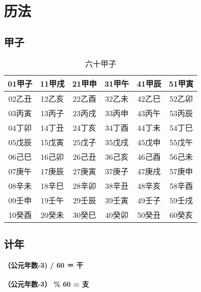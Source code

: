 \section{历法}
\subsection{甲子}
\begin{table}[H]
  \centering
  \caption[]{六十甲子\footnotemark}
  \begin{tabular}{|c|c|c|c|c|c|}
    \hline 01甲子 & 11甲戌 & 21甲申 & 31甲午 & 41甲辰 & 51甲寅 \\
    \hline 02乙丑 & 12乙亥 & 22乙酉 & 32乙未 & 42乙巳 & 52乙卯 \\
    \hline 03丙寅 & 13丙子 & 23丙戌 & 33丙申 & 43丙午 & 53丙辰 \\
    \hline 04丁卯 & 14丁丑 & 24丁亥 & 34丁酉 & 44丁未 & 54丁巳 \\
    \hline 05戊辰 & 15戊寅 & 25戊子 & 35戊戌 & 45戊申 & 55戊午 \\
    \hline 06己巳 & 16己卯 & 26己丑 & 36己亥 & 46己酉 & 56己未 \\
    \hline 07庚午 & 17庚辰 & 27庚寅 & 37庚子 & 47庚戌 & 57庚申 \\
    \hline 08辛未 & 18辛巳 & 28辛卯 & 38辛丑 & 48辛亥 & 58辛酉 \\
    \hline 09壬申 & 19壬午 & 29壬辰 & 39壬寅 & 49壬子 & 59壬戌 \\
    \hline 10癸酉 & 20癸未 & 30癸巳 & 40癸卯 & 50癸丑 & 60癸亥 \\
    \hline
  \end{tabular}
\end{table}

\subsection{计年}
\paragraph{（公元年数-3) / 60 ＝ 干}
\paragraph{（公元年数-3） \% 60 = 支}

